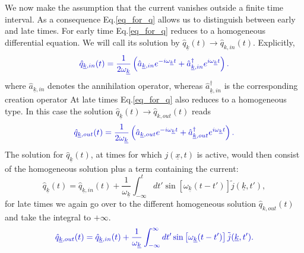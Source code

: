 \documentclass[12pt, titlepage]{article}
\begin{document}
We now make the assumption that the current vanishes outside a finite time interval. 
As a consequence Eq.\eqref{eq_for_q} allows us to distinguish between early and late times. For early time  Eq.\eqref{eq_for_q} reduces to a homogeneous differential equation. We will call its solution by $ \hat{q}_{\underline{k}}(t) \rightarrow \hat{q}_{k,in}(t) $. Explicitly, 
\begin{equation}\label{q_In_operators}
 \textcolor[RGB]{0,0,204}{
 \hat{q}_{\underline{k},in}(t) 
  =
  \dfrac{1}{2\omega_{\underline{k}}}\left(
	\hat{a}_{\underline{k},in} 
	e^{-i\omega_{\underline{k}}t}
	+
	\hat{a}^{\dagger}_{\underline{k},in}  
	e^{i\omega_{\underline{k}}t}
  \right) 
  .}
\end{equation}
where $ \hat{a}_{\underline{k},in} $ denotes the annihilation operator, whereas $ \hat{a}^{\dagger}_{\underline{k},in} $ is the corresponding creation operator
At late times Eq.\eqref{eq_for_q} also reduces to a homogeneous type. In this case the solution $ \hat{q}_{\underline{k}}(t) \rightarrow \hat{q}_{k,out}(t) $ reads
\begin{equation}\label{q_Out_operators}
 \textcolor[RGB]{0,0,204}{
 \hat{q}_{\underline{k},out}(t) 
  =
  \dfrac{1}{2\omega_{\underline{k}}}\left(
	\hat{a}_{\underline{k},out} 
	e^{-i\omega_{\underline{k}}t}
	+
	\hat{a}^{\dagger}_{\underline{k},out}  
	e^{i\omega_{\underline{k}}t}
  \right) 
  .}
\end{equation}
The solution for $ \hat{q}_{\underline{k}}(t) $, at times for which $ j(\underline{x},t) $ is active, would then consist of the homogeneous solution plus a term containing the current:
\begin{equation}
 \hat{q}_{\underline{k}}(t) 
  =
  \hat{q}_{\underline{k},in}(t) 
  +
    \dfrac{1}{\omega_{\underline{k}}}
    \int^{t}_{-\infty}
    dt'
    \sin\left[\omega_{\underline{k}}(t-t') \right] \tilde{j}(\underline{k},t'),
\end{equation}
for late times we again go over to the different homogeneous solution $ \hat{q}_{k,out}(t)  $ and take the integral to $ +\infty $.
\begin{equation}\label{q_Out_by_q_In}
 \textcolor[RGB]{0,0,204}{
\hat{q}_{\underline{k},out}(t) 
  =
  \hat{q}_{\underline{k},in}(t) 
  +
    \dfrac{1}{\omega_{\underline{k}}}
    \int^{\infty}_{-\infty}
    dt'
    \sin
    \left[
    \omega_{\underline{k}}(t-t') 
    \right]
     \tilde{j}(\underline{k},t')
  .}
\end{equation}
\end{document}
